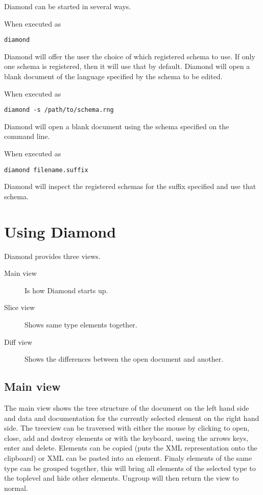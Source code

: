 Diamond can be started in several ways.

When executed as
\begin{verbatim}
diamond
\end{verbatim}
Diamond will offer the user the choice of which registered schema to use.
If only one schema is registered, then it will use that by default.
Diamond will open a blank document of the language specified by the schema to be edited.

When executed as
\begin{verbatim}
diamond -s /path/to/schema.rng
\end{verbatim}
Diamond will open a blank document using the schema specified on the command line.

When executed as
\begin{verbatim}
diamond filename.suffix
\end{verbatim}
Diamond will inspect the registered schemas for the suffix specified
and use that schema.

\section{Using Diamond}

Diamond provides three views.
\begin{description}
\item[Main view] Is how Diamond starts up.
\item[Slice view] Shows same type elements together.
\item[Diff view] Shows the differences between the open document and another.
\end{description}

\subsection{Main view}
The main view shows the tree structure of the document on the left hand side and
data and documentation for the currently selected element on the right hand side.
The treeview can be traversed with either the mouse by clicking to open, close, add and 
destroy elements or with the keyboard, useing the arrows keys, enter and delete.
Elements can be copied (puts the XML representation onto the clipboard) or XML can be pasted into 
an element.
Finaly elements of the same type can be grouped together, this will bring all elements of the selected 
type to the toplevel and hide other elements. Ungroup will then return the view to normal.

